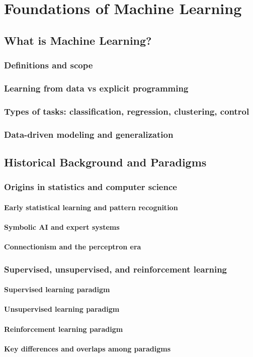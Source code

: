 \chapter{Foundations of Machine Learning}

\section{What is Machine Learning?}
\subsection{Definitions and scope}
\subsection{Learning from data vs explicit programming}
\subsection{Types of tasks: classification, regression, clustering, control}
\subsection{Data-driven modeling and generalization}

\section{Historical Background and Paradigms}
\subsection{Origins in statistics and computer science}
\subsubsection{Early statistical learning and pattern recognition}
\subsubsection{Symbolic AI and expert systems}
\subsubsection{Connectionism and the perceptron era}
\subsection{Supervised, unsupervised, and reinforcement learning}
\subsubsection{Supervised learning paradigm}
\subsubsection{Unsupervised learning paradigm}
\subsubsection{Reinforcement learning paradigm}
\subsubsection{Key differences and overlaps among paradigms}